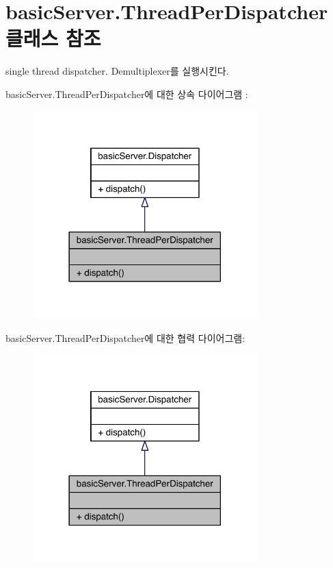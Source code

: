 \hypertarget{classbasic_server_1_1_thread_per_dispatcher}{\section{basic\+Server.\+Thread\+Per\+Dispatcher 클래스 참조}
\label{classbasic_server_1_1_thread_per_dispatcher}
}


single thread dispatcher. Demultiplexer를 실행시킨다.  




basic\+Server.\+Thread\+Per\+Dispatcher에 대한 상속 다이어그램 \+: 
\nopagebreak
\begin{figure}[H]
\begin{center}
\leavevmode
\includegraphics[width=246pt]{classbasic_server_1_1_thread_per_dispatcher__inherit__graph}
\end{center}
\end{figure}


basic\+Server.\+Thread\+Per\+Dispatcher에 대한 협력 다이어그램\+:
\nopagebreak
\begin{figure}[H]
\begin{center}
\leavevmode
\includegraphics[width=246pt]{classbasic_server_1_1_thread_per_dispatcher__coll__graph}
\end{center}
\end{figure}

